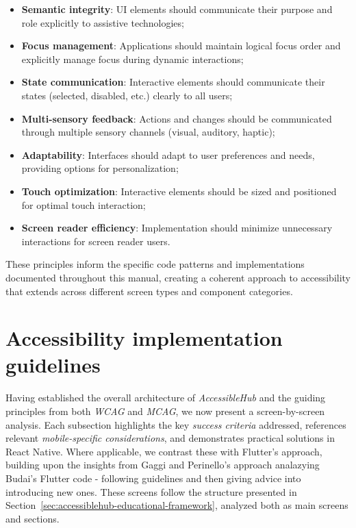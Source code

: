 \begin{itemize}
    \item \textbf{Semantic integrity}: UI elements should communicate their purpose and role explicitly to assistive technologies;
    
    \item \textbf{Focus management}: Applications should maintain logical focus order and explicitly manage focus during dynamic interactions;
    
    \item \textbf{State communication}: Interactive elements should communicate their states (selected, disabled, etc.) clearly to all users;
    
    \item \textbf{Multi-sensory feedback}: Actions and changes should be communicated through multiple sensory channels (visual, auditory, haptic);
    
    \item \textbf{Adaptability}: Interfaces should adapt to user preferences and needs, providing options for personalization;
    
    \item \textbf{Touch optimization}: Interactive elements should be sized and positioned for optimal touch interaction;
    
    \item \textbf{Screen reader efficiency}: Implementation should minimize unnecessary interactions for screen reader users.
\end{itemize}

These principles inform the specific code patterns and implementations documented throughout this manual, creating a coherent approach to accessibility that extends across different screen types and component categories.

\section{Accessibility implementation guidelines}
\label{sec:implementation-guidelines}

Having established the overall architecture of \textit{AccessibleHub} and the guiding principles from both \textit{WCAG} and \textit{MCAG}, we now present a screen-by-screen analysis. Each subsection highlights the key \textit{success criteria} addressed, references relevant \textit{mobile-specific considerations}, and demonstrates practical solutions in React Native. Where applicable, we contrast these with Flutter's approach, building upon the insights from Gaggi and Perinello's approach \cite{budai2024mobile} analazying Budai's Flutter code - following guidelines and then giving advice into introducing new ones. These screens follow the structure presented in Section~\ref{sec:accessiblehub-educational-framework}, analyzed both as main screens and sections.

